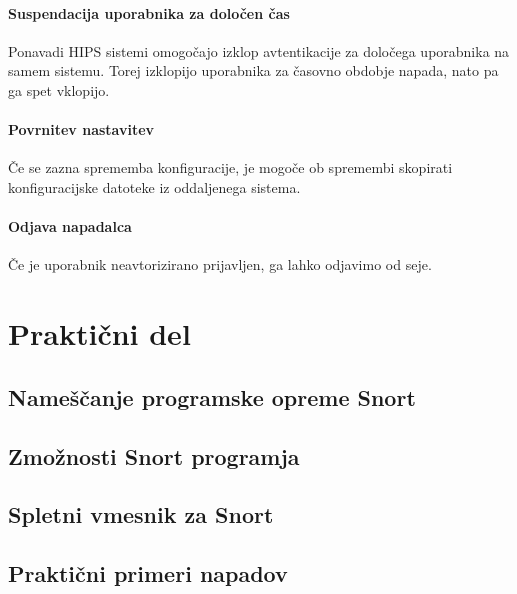 \documentclass[12pt]{article}
\let\stdsection\section
\renewcommand\section{\newpage\stdsection}
\begin{document}

\paragraph{Suspendacija uporabnika za določen čas} %

Ponavadi HIPS sistemi omogočajo izklop avtentikacije za določega uporabnika na samem sistemu.
Torej izklopijo uporabnika za časovno obdobje napada, nato pa ga spet vklopijo.


\paragraph{Povrnitev nastavitev} %

Če se zazna sprememba konfiguracije, je mogoče ob spremembi skopirati konfiguracijske datoteke iz oddaljenega sistema.


\paragraph{Odjava napadalca} %

Če je uporabnik neavtorizirano prijavljen, ga lahko odjavimo od seje.





\section{Praktični del}

\subsection{Nameščanje programske opreme Snort}
\subsection{Zmožnosti Snort programja}
\subsection{Spletni vmesnik za Snort}
\subsection{Praktični primeri napadov}
\end{document}
